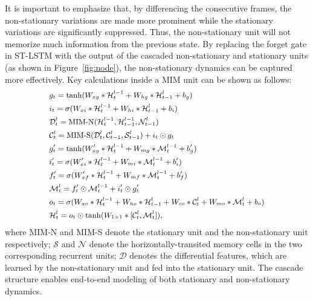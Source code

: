 \documentclass[10pt,twocolumn,letterpaper]{article}
\begin{document}
It is important to emphasize that, by differencing the consecutive frames, the non-stationary variations are made more prominent while the stationary variations are significantly suppressed. Thus, the non-stationary unit will not memorize much information from the previous state. By replacing the forget gate in ST-LSTM with the output of the cascaded non-stationary and stationary units (as shown in Figure~\ref{fig:node}), the non-stationary dynamics can be captured more effectively. Key calculations inside a MIM unit can be shown as follows:
\begin{equation}\label{equ:MIM}
  \small
  \begin{split}
  & g_t = \tanh(W_{xg} \ast \mathcal{H}_t^{l-1} + W_{hg} \ast \mathcal{H}_{t-1}^l + b_g) \\
  & i_t = \sigma(W_{xi} \ast \mathcal{H}_t^{l-1} + W_{hi} \ast \mathcal{H}_{t-1}^l + b_i) \\
  & \mathcal{D}_t^l = \text{MIM-N}(\mathcal{H}_t^{l-1}, \mathcal{H}_{t-1}^{l-1}, \mathcal{N}_{t-1}^l) \\
  & \mathcal{C}_t^l = \text{MIM-S}(\mathcal{D}_t^l, \mathcal{C}_{t-1}^l, \mathcal{S}_{t-1}^l) + i_t \odot g_t \\
  & g_t^\prime = \tanh(W_{xg}^\prime \ast \mathcal{H}_t^{l-1} + W_{mg} \ast \mathcal{M}_t^{l-1} + b_g^\prime) \\
  & i_t^\prime = \sigma(W_{xi}^\prime \ast \mathcal{H}_t^{l-1} + W_{mi} \ast \mathcal{M}_t^{l-1} + b_i^\prime) \\
  & f_t^\prime = \sigma(W_{xf}^\prime \ast \mathcal{H}_t^{l-1} + W_{mf} \ast \mathcal{M}_t^{l-1} + b_f^\prime) \\
  & \mathcal{M}_t^l = f_t^\prime \odot \mathcal{M}_t^{l-1} + i_t^\prime \odot g_t^\prime \\
  & o_t = \sigma(W_{xo} \ast \mathcal{H}_t^{l-1} + W_{ho} \ast \mathcal{H}_{t-1}^l + W_{co} \ast \mathcal{C}_t^l + W_{mo} \ast \mathcal{M}_t^l + b_o) \\ 
  & \mathcal{H}_t^l = o_t \odot \tanh(W_{1\times1} \ast [\mathcal{C}_t^l, \mathcal{M}_t^l]),\\
  \end{split}
\end{equation}
where MIM-N and MIM-S denote the stationary unit and the non-stationary unit respectively; $\mathcal{S}$ and $\mathcal{N}$ denote the horizontally-transited memory cells in the two corresponding recurrent units; $\mathcal{D}$ denotes the differential features, which are learned by the non-stationary unit and fed into the stationary unit. The cascade structure enables end-to-end modeling of both stationary and non-stationary dynamics.
\end{document}
